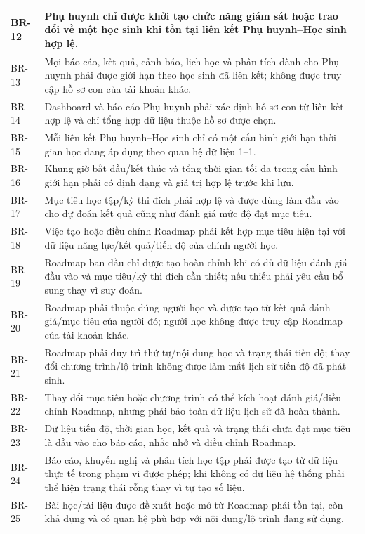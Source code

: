 \documentclass[12pt,a4paper,oneside]{report}
\begin{document}
\begin{longtable}{|p{1.6cm}|p{12.7cm}|}
BR-12 & Phụ huynh chỉ được khởi tạo chức năng giám sát hoặc trao đổi về một học sinh khi tồn tại liên kết Phụ huynh--Học sinh hợp lệ. \\ \hline
BR-13 & Mọi báo cáo, kết quả, cảnh báo, lịch học và phân tích dành cho Phụ huynh phải được giới hạn theo học sinh đã liên kết; không được truy cập hồ sơ con của tài khoản khác. \\ \hline
BR-14 & Dashboard và báo cáo Phụ huynh phải xác định hồ sơ con từ liên kết hợp lệ và chỉ tổng hợp dữ liệu thuộc hồ sơ được chọn. \\ \hline
BR-15 & Mỗi liên kết Phụ huynh--Học sinh chỉ có một cấu hình giới hạn thời gian học đang áp dụng theo quan hệ dữ liệu 1--1. \\ \hline
BR-16 & Khung giờ bắt đầu/kết thúc và tổng thời gian tối đa trong cấu hình giới hạn phải có định dạng và giá trị hợp lệ trước khi lưu. \\ \hline
BR-17 & Mục tiêu học tập/kỳ thi đích phải hợp lệ và được dùng làm đầu vào cho dự đoán kết quả cũng như đánh giá mức độ đạt mục tiêu. \\ \hline
BR-18 & Việc tạo hoặc điều chỉnh Roadmap phải kết hợp mục tiêu hiện tại với dữ liệu năng lực/kết quả/tiến độ của chính người học. \\ \hline
BR-19 & Roadmap ban đầu chỉ được tạo hoàn chỉnh khi có đủ dữ liệu đánh giá đầu vào và mục tiêu/kỳ thi đích cần thiết; nếu thiếu phải yêu cầu bổ sung thay vì suy đoán. \\ \hline
BR-20 & Roadmap phải thuộc đúng người học và được tạo từ kết quả đánh giá/mục tiêu của người đó; người học không được truy cập Roadmap của tài khoản khác. \\ \hline
BR-21 & Roadmap phải duy trì thứ tự/nội dung học và trạng thái tiến độ; thay đổi chương trình/lộ trình không được làm mất lịch sử tiến độ đã phát sinh. \\ \hline
BR-22 & Thay đổi mục tiêu hoặc chương trình có thể kích hoạt đánh giá/điều chỉnh Roadmap, nhưng phải bảo toàn dữ liệu lịch sử đã hoàn thành. \\ \hline
BR-23 & Dữ liệu tiến độ, thời gian học, kết quả và trạng thái chưa đạt mục tiêu là đầu vào cho báo cáo, nhắc nhở và điều chỉnh Roadmap. \\ \hline
BR-24 & Báo cáo, khuyến nghị và phân tích học tập phải được tạo từ dữ liệu thực tế trong phạm vi được phép; khi không có dữ liệu hệ thống phải thể hiện trạng thái rỗng thay vì tự tạo số liệu. \\ \hline
BR-25 & Bài học/tài liệu được đề xuất hoặc mở từ Roadmap phải tồn tại, còn khả dụng và có quan hệ phù hợp với nội dung/lộ trình đang sử dụng. \\ \hline

\end{longtable}
\end{document}
